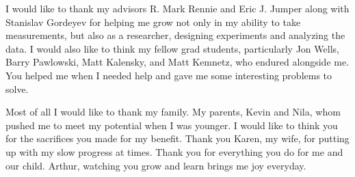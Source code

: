 I would like to thank my advisors R. Mark Rennie and Eric J. Jumper along with Stanislav Gordeyev for helping me grow not only in my ability to take measurements, but also as a researcher, designing experiments and analyzing the data.
I would also like to think my fellow grad students, particularly Jon Wells, Barry Pawlowski, Matt Kalensky, and Matt Kemnetz, who endured alongside me.
You helped me when I needed help and gave me some interesting problems to solve.

Most of all I would like to thank my family.
My parents, Kevin and Nila, whom pushed me to meet my potential when I was younger.
I would like to think you for the sacrifices you made for my benefit.
Thank you Karen, my wife, for putting up with my slow progress at times.
Thank you for everything you do for me and our child.
Arthur, watching you grow and learn brings me joy everyday.
